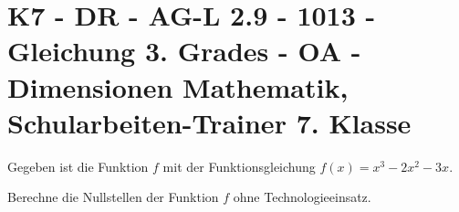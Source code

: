 \section{K7 - DR - AG-L 2.9 - 1013 - Gleichung 3. Grades - OA - Dimensionen Mathematik, Schularbeiten-Trainer 7. Klasse}

\begin{beispiel}[K7 - DR]{1} %
Gegeben ist die Funktion $f$ mit der Funktionsgleichung $f(x)=x^3-2x^2-3x$.

Berechne die Nullstellen der Funktion $f$ ohne Technologieeinsatz.\leer

				
				\end{beispiel}